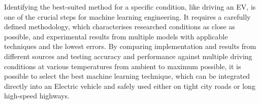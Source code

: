 Identifying the best-suited method for a specific condition, like driving an EV, is one of the crucial steps for machine learning engineering.
It requires a carefully defined methodology, which characterises researched conditions as close as possible, and experimental results from multiple models with applicable techniques and the lowest errors.
By comparing implementation and results from different sources and testing accuracy and performance against multiple driving conditions at various temperatures from ambient to maximum possible, it is possible to select the best machine learning technique, which can be integrated directly into an Electric vehicle and safely used either on tight city roads or long high-speed highways.
%
%


